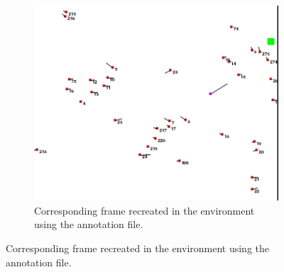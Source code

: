 \begin{enumerate}
\begin{figure}[htbp]
\begin{subfigure}{0.5\textwidth}
		\includegraphics[width=0.95\linewidth]{figures/env_screenshot3.jpg}
		\caption{Corresponding frame recreated in the environment using the annotation file.}
		\label{fig:anno_sfig2}
	\end{subfigure}
\end{figure}
\end{enumerate}
